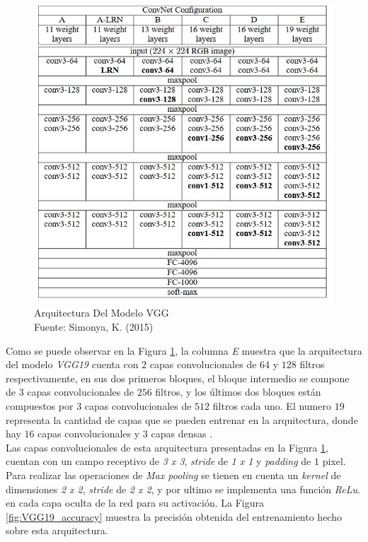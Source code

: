 \begin{figure}[ht]
	\centering
	\includegraphics[scale=0.42]{Figs/22.jpeg}
	\caption{Arquitectura Del Modelo VGG \\ Fuente: Simonya, K. (2015)}
	\label{fig:VGG19}
\end{figure}			


Como se puede observar en la Figura \ref{fig:VGG19}, la columna \textit{E} muestra que la arquitectura del modelo \textit{VGG19}  cuenta con $2$ capas convolucionales de $64$ y $128$ filtros respectivamente, en sus dos primeros bloques, el bloque intermedio se compone de $3$ capas convolucionales de $256$ filtros, y los últimos dos bloques están compuestos por $3$ capas convolucionales de $512$ filtros cada uno. El numero $19$ representa la cantidad de capas que se pueden entrenar en la arquitectura, donde hay $16$ capas convolucionales y $3$ capas densas \cite{19}.\\			

Las capas convolucionales de esta arquitectura presentadas en la Figura \ref{fig:VGG19}, cuentan con un campo receptivo de \textit{3 x 3}, \textit{stride} de \textit{1 x 1} y \textit{padding} de $1$ pixel. Para realizar las operaciones de \textit{Max pooling} se tienen en cuenta un \textit{kernel} de dimensiones \textit{2 x 2}, \textit{stride} de \textit{2 x 2}, y por ultimo se implementa una función \textit{ReLu}. en cada capa oculta de la red para su activación. La Figura \ref{fig:VGG19_accuracy} muestra la precisión obtenida del entrenamiento hecho sobre esta arquitectura.

